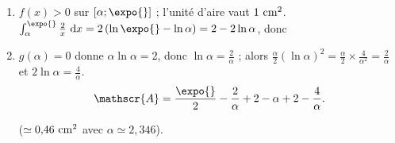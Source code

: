 \begin{enumerate}
\begin{enumerate}

				(La valeur donnée se vérifie : $\int_\alpha^{\expo{}}\ln x\dx = \big[x\ln x - x\big]_\alpha^{\expo{}} = -\alpha\ln\alpha + \alpha$.)
			\item {}
				$f(x) > 0$ sur $[\alpha;\expo{}]$ ; l'unité d'aire vaut $1~\mathrm{cm}^2$.
				$\int_\alpha^{\expo{}}\frac{2}{x}\dx = 2\left(\ln\expo{} - \ln\alpha\right) = 2 - 2\ln\alpha$, donc

			\item {}
				$g(\alpha) = 0$ donne $\alpha\ln\alpha = 2$, donc $\ln\alpha = \frac{2}{\alpha}$ ; alors
				$\frac{\alpha}{2}(\ln\alpha)^2 = \frac{\alpha}{2}\times\frac{4}{\alpha^2} = \frac{2}{\alpha}$ et $2\ln\alpha = \frac{4}{\alpha}$.
				\[
					\mathscr{A} = \frac{\expo{}}{2} - \frac{2}{\alpha} + 2 - \alpha + 2 - \frac{4}{\alpha}.
				\]

				 ($\simeq 0{,}46~\mathrm{cm}^2$ avec $\alpha \simeq 2{,}346$).
		\end{enumerate}
	\end{enumerate}

